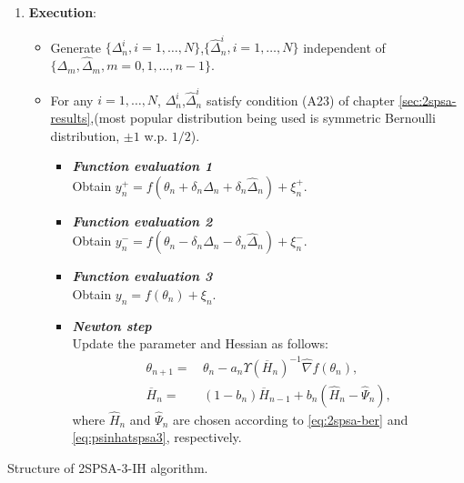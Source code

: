 \begin{algorithm}[!htp]

\begin{enumerate}

 \item \textbf{Execution}: \\
  {
 \begin{itemize}
 \item Generate $\{\Delta_n^{i}, i=1,\ldots,N\}$,$\{\widehat\Delta_n^{i}, i=1,\ldots,N\}$ independent of $\{\Delta_m,\widehat\Delta_m, m=0,1,\ldots,n-1\}$.  
 \item For any $i=1,\ldots,N$, $\Delta_n^{i}$,$\widehat\Delta_n^{i}$  satisfy condition (A23) of chapter \ref{sec:2spsa-results},(most popular distribution being used is symmetric Bernoulli distribution, $\pm 1$ w.p. $1/2$).
\begin{itemize}
\item \textbf{\emph {Function evaluation 1} }\\ \hspace{4em} Obtain $y_n^+ = f(\theta_n+\delta_n \Delta_n +\delta_n \widehat\Delta_n) + \xi_n^+$.
\item \textbf{\emph {Function evaluation 2} }\\ \hspace{4em} Obtain $y_n^- = f(\theta_n -\delta_n\Delta_n-\delta_n\widehat\Delta_n) + \xi_n^-$.
\item \textbf{\emph {Function evaluation 3} }\\ \hspace{4em} Obtain $y_n = f(\theta_n) + \xi_n$.
\item \textbf{\emph {Newton step}}\\ \hspace{4.2em} Update the parameter and Hessian as follows:
\begin{align} \label{eq:2spsa-3-theta}
\theta_{n+1} = \,& \theta_n - a_n \Upsilon(\overline H_n)^{-1}\widehat\nabla f(\theta_n),\\
\overline H_n =\,& (1-b_{n})  \overline H_{n-1} + b_{n} ( \widehat H_n - \widehat \Psi_n),\label{eq:2spsa-3-ih}
\end{align}
where $\widehat H_n$ and $\widehat \Psi_n$ are chosen according to \eqref{eq:2spsa-ber} and \eqref{eq:psinhatspsa3}, respectively. 
\end{itemize}

\end{itemize}
}
\end{enumerate}

\caption{Structure of 2SPSA-3-IH algorithm.}
\label{alg:spsa-3-ih-structure}
\end{algorithm}


